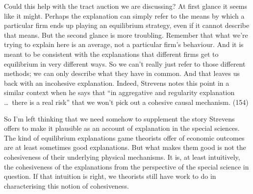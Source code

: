 Could this help with the tract auction we are discussing? At first glance it seems like it might. Perhaps the explanation can simply refer to the means by which a particular firm ends up playing an equilibrium strategy, even if it cannot describe that means. But the second glance is more troubling. Remember that what we're trying to explain here is an average, not a particular firm's behaviour. And it is meant to be consistent with the explanations that different firms get to equilibrium in very different ways. So we can't really just refer to those different methods; we can only describe what they have in common. And that leaves us back with an incohesive explanation. Indeed, Strevens notes this point in a similar context when he says that ``in aggregative and regularity explanation \ldots\ there is a real risk'' that we won't pick out a cohesive causal mechanism. (154)

So I'm left thinking that we need somehow to supplement the story Strevens offers to make it plausible as an account of explanation in the special sciences. The kind of equilibrium explanations game theorists offer of economic outcomes are at least sometimes good explanations. But what makes them good is not the cohesiveness of their underlying physical mechanisms. It is, at least intuitively, the cohesiveness of the explanations from the perspective of the special science in question. If that intuition is right, we theorists still have work to do in characterising this notion of cohesiveness.
